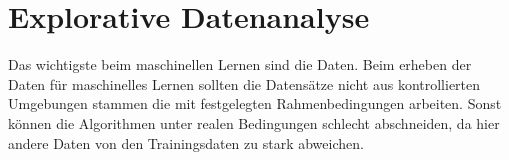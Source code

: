\chapter{Explorative Datenanalyse}
Das wichtigste beim maschinellen Lernen sind die Daten. Beim erheben der Daten für maschinelles Lernen sollten die Datensätze nicht aus kontrollierten Umgebungen stammen die mit festgelegten Rahmenbedingungen arbeiten. Sonst können die Algorithmen unter realen Bedingungen schlecht abschneiden, da hier andere Daten von den Trainingsdaten zu stark abweichen.

